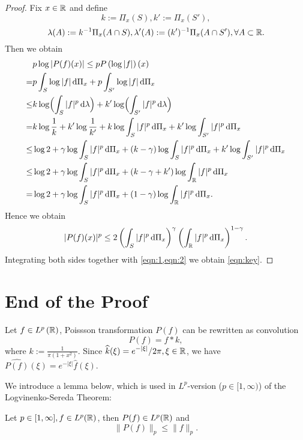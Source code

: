 \begin{proof}
	Fix $x\in \mathbb{R}$ and define
	\[
	k:=\Pi_x(S), k':=\Pi_x(S'), \]
	\[\lambda(A):=k^{-1}\Pi_x(A\cap S), \lambda'(A):=(k')^{-1}\Pi_x(A\cap S'), \forall A\subset \mathbb{R}.
	\] 
	Then we obtain
	\begin{align*}
		& p \log |P(f)(x)|\le p P\left( \log |f| \right) (x) \\
		= & p \int_S  \log|f|\,\mathrm{d} \Pi_x + p \int_{S'} \log|f|\,\mathrm{d} \Pi_x\\
		\le & k \log \Bigl( \int_S |f|^{p}\,\mathrm{d} \lambda \Bigr)+  k' \log \Bigl( \int_{S'}|f|^{p}\,\mathrm{d} \lambda \Bigr)\\
		= & k \log \frac{1}{k}+ k' \log \frac{1}{k'}+k\log \int_{S}|f|^{p} \,\mathrm{d} \Pi_x +k' \log \int_{S'}|f|^{p}\,\mathrm{d} \Pi_x\\
		\le & \log 2 +\gamma \log \int_S |f|^{p}\,\mathrm{d} \Pi_x +(k-\gamma)\log\int_{S}|f|^{p}\,\mathrm{d} \Pi_x+k' \log \int_{S'}|f|^{p}\,\mathrm{d} \Pi_x\\
		\le & \log 2+ \gamma \log \int_S |f|^{p}\,\mathrm{d} \Pi_x+ (k-\gamma+k') \log \int_{\mathbb{R}}|f|^{p}\,\mathrm{d} \Pi_x \\
		= & \log 2 +\gamma \log \int_S|f|^{p}\,\mathrm{d} \Pi_x+ (1-\gamma) \log \int _{\mathbb{R}}|f|^{p}\,\mathrm{d} \Pi_x
	.\end{align*}
Hence we obtain
\[
|P(f)(x)|^{p}\le 2\left( \int_S|f|^{p}\,\mathrm{d} \Pi_x\right)^{\gamma}\left( \int_{\mathbb{R}} |f|^{p}\,\mathrm{d} \Pi_x \right)^{1-\gamma}. 
\] 
Integrating both sides together with \cref{eqn:1,eqn:2} we obtain \cref{eqn:key}. 
\end{proof}

\section{End of the Proof}

Let $f \in L^{p}\left( \mathbb{R} \right) $, Poissson transformation $P(f)$ can be rewritten as convolution
\[
P(f)=f * k,
\] 
where $\displaystyle k:= \frac{1}{\pi (1+x^2)}$. Since $\displaystyle \widehat{k}(\xi)=e^{-|\xi|} /2\pi, \xi \in \mathbb{R}$, we have $\widehat{P(f)}(\xi)=e^{-|\xi|}\widehat{f}(\xi)$.

We introduce a lemma below, which is used in $L^{p}$-version ($p \in [1,\infty)$) of the Logvinenko-Sereda Theorem:
\begin{lemma} \label{lma:p}
	Let $p \in [1,\infty], f \in L^{p}(\mathbb{R})$, then $P(f) \in L^{p}(\mathbb{R})$ and 
	\[
	\|P(f)\|_p\le \|f\|_p.
	\] 
\end{lemma}

